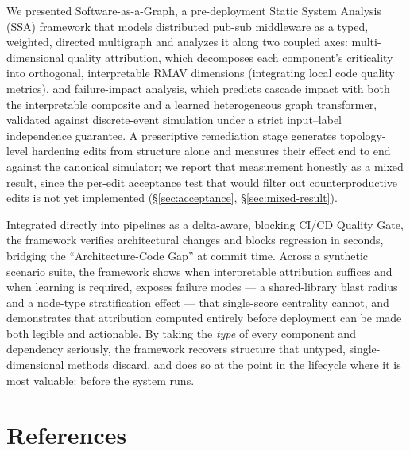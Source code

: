 \documentclass[review]{elsarticle}
\begin{document}
We presented Software-as-a-Graph, a pre-deployment Static System Analysis (SSA) framework that
models distributed pub-sub middleware as a typed, weighted, directed multigraph and analyzes it
along two coupled axes: multi-dimensional quality attribution, which decomposes each component's
criticality into orthogonal, interpretable RMAV dimensions (integrating local code quality metrics),
and failure-impact analysis, which predicts cascade impact with both the interpretable composite and
a learned heterogeneous graph transformer, validated against discrete-event simulation under a
strict input--label independence guarantee. A prescriptive remediation stage generates
topology-level hardening edits from structure alone and measures their effect end to end against the
canonical simulator; we report that measurement honestly as a mixed result, since the per-edit
acceptance test that would filter out counterproductive edits is not yet implemented
(\S\ref{sec:acceptance}, \S\ref{sec:mixed-result}).

Integrated directly into pipelines as a delta-aware, blocking CI/CD Quality Gate, the framework
verifies architectural changes and blocks regression in seconds, bridging the ``Architecture-Code
Gap'' at commit time. Across a synthetic scenario suite, the framework shows when interpretable
attribution suffices and when learning is required, exposes failure modes --- a shared-library blast
radius and a node-type stratification effect --- that single-score centrality cannot, and
demonstrates that attribution computed entirely before deployment can be made both legible and
actionable. By taking the \emph{type} of every component and dependency seriously, the framework
recovers structure that untyped, single-dimensional methods discard, and does so at the point in the
lifecycle where it is most valuable: before the system runs.

\section*{References}
\end{document}
